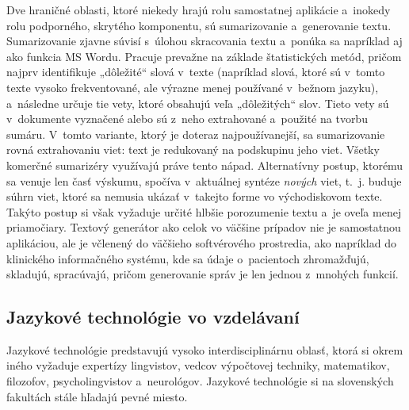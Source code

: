 \begin{multicols}{2}
Dve hraničné oblasti, ktoré niekedy hrajú rolu samostatnej aplikácie a~inokedy rolu podporného, skrytého komponentu, sú sumarizovanie a~generovanie textu. Sumarizovanie zjavne súvisí s~úlohou skracovania textu a~ponúka sa napríklad aj ako funkcia MS Wordu. Pracuje prevažne na základe štatistických metód, pričom najprv identifikuje „dôležité“ slová v~texte (napríklad slová, ktoré sú v~tomto texte vysoko frekventované, ale výrazne menej používané v~bežnom jazyku), a~následne určuje tie vety, ktoré obsahujú veľa „dôležitých“ slov. Tieto vety sú v~dokumente vyznačené alebo sú z~neho extrahované a~použité na tvorbu sumáru. V~tomto variante, ktorý je doteraz najpoužívanejší, sa sumarizovanie rovná extrahovaniu viet: text je redukovaný na podskupinu jeho viet. Všetky komerčné sumarizéry využívajú práve tento nápad. Alternatívny postup, ktorému sa venuje len časť výskumu, spočíva v~aktuálnej syntéze \emph{nových} viet, t.~j. buduje súhrn viet, ktoré sa nemusia ukázať v~takejto forme vo východiskovom texte. Takýto postup si však vyžaduje určité hlbšie porozumenie textu a~je oveľa menej priamočiary. Textový generátor ako celok vo väčšine prípadov nie je samostatnou aplikáciou, ale je včlenený do väčšieho softvérového prostredia, ako napríklad do klinického informačného systému, kde sa údaje o~pacientoch zhromažďujú, skladujú, spracúvajú, pričom generovanie správ je len jednou z~mnohých funkcií. 

\subsection{Jazykové technológie vo vzdelávaní}
Jazykové technológie predstavujú vysoko interdisciplinárnu oblasť, ktorá si okrem iného vyžaduje expertízy lingvistov, vedcov výpočtovej techniky, matematikov, filozofov, psycholingvistov a~neurológov. Jazykové technológie si na slovenských fakultách stále hľadajú pevné miesto.



\end{multicols}
